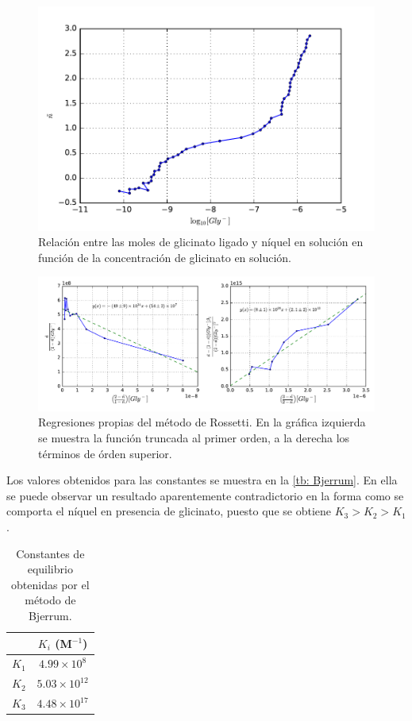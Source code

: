 \documentclass[fleqn,10pt]{SelfArx} %
\begin{document}
	\begin{figure}[h]
		\centering
		\includegraphics[width=\linewidth]{images/Bjerrum.pdf}
		\caption{Relaci\'on entre las moles de glicinato ligado y n\'iquel en soluci\'on en funci\'on de la concentraci\'on de glicinato en soluci\'on.}
		\label{fig: Bjerrum}
	\end{figure}
	
	\begin{figure}[h]
		\centering
		\includegraphics[width=\linewidth]{images/Rossotti.pdf}
		\caption{Regresiones propias del m\'etodo de Rossetti. En la gr\'afica izquierda se muestra la funci\'on truncada al primer orden, a la derecha los t\'erminos de \'orden superior.}
		\label{fig: Rossetti}
	\end{figure}
	
	Los valores obtenidos para las constantes se muestra en la \autoref{tb: Bjerrum}. En ella se puede observar un resultado aparentemente contradictorio en la forma como se comporta el n\'iquel en presencia de glicinato, puesto que se obtiene $K_3 > K_2 > K_1$.
	\pagebreak
	
	\begin{table}[h]
		\centering
		\caption{Constantes de equilibrio obtenidas por el m\'etodo de Bjerrum.}
		\begin{tabular}{cc}
			\hline
			 & $K_i$ (M$^{-1}$) \\
			\hline
			$K_1$ & $4.99\times10^{8}$ \\
			$K_2$ & $5.03\times10^{12}$ \\
			$K_3$ & $4.48\times10^{17}$ \\
			\hline
		\end{tabular}
		\label{tb: Bjerrum}
	\end{table}
	
\end{document}
